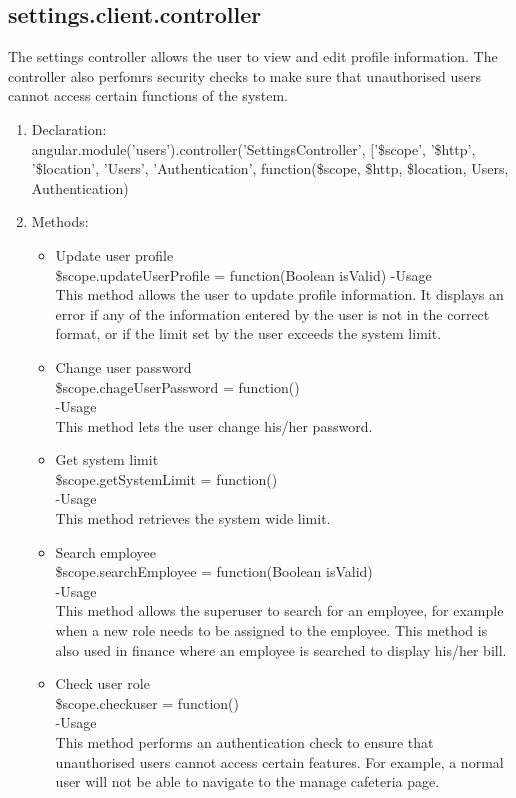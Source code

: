 \documentclass[a4paper,12pt]{article}
\begin{document}
\subsection{settings.client.controller}
 The settings controller allows the user to view and edit profile information. The controller also perfomrs security checks to make sure that unauthorised users cannot access certain functions of the system.
 \begin{enumerate}
 \item Declaration:\\angular.module('users').controller('SettingsController', ['\$scope', '\$http', '\$location', 'Users', 'Authentication',
	function(\$scope, \$http, \$location, Users, Authentication) 
	\item Methods:\\
	\begin{itemize}
	\item Update user profile\\
 \$scope.updateUserProfile = function(Boolean isValid)
 -Usage\\
 This method allows the user to update profile information. It displays an error if any of the information entered by the user is not in the correct format, or if the limit set by the user exceeds the system limit.

\item Change user password\\
 \$scope.chageUserPassword = function()\\
-Usage\\
This method lets the user change his/her password.

\item Get system limit\\
 \$scope.getSystemLimit = function()\\
-Usage\\
This method retrieves the system wide limit.

\item Search employee\\
 \$scope.searchEmployee = function(Boolean isValid)\\
-Usage\\
This method allows the superuser to search for an employee, for example when a new role needs to be assigned to the employee.
This method is also used in finance where an employee is searched to display his/her bill.

\item Check user role\\
 \$scope.checkuser = function()\\
-Usage\\
This method performs an authentication check to ensure that unauthorised users cannot access certain features. For example, a normal user will not be able to navigate to the manage cafeteria page.


\end{itemize}
\end{enumerate}
\end{document}
